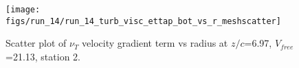 \begin{figure}[H]
\centering
\texttt{[image: figs/run\_14/run\_14\_turb\_visc\_ettap\_bot\_vs\_r\_meshscatter]}
\caption{Scatter plot of $\nu_T$ velocity gradient term vs radius at $z/c$=6.97, $V_{free}$=21.13, station 2.}
\label{fig:run_14_turb_visc_ettap_bot_vs_r_meshscatter}
\end{figure}


